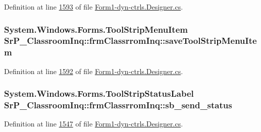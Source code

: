 \-Definition at line \hyperlink{_form1-dyn-ctrls_8_designer_8cs_source_l01593}{1593} of file \hyperlink{_form1-dyn-ctrls_8_designer_8cs_source}{\-Form1-\/dyn-\/ctrls.\-Designer.\-cs}.

\hypertarget{class_sr_p___classroom_inq_1_1frm_classrrom_inq_a7e580a014ae78cc9e8d2ce621a2541f3}{
\subsubsection[{save\-Tool\-Strip\-Menu\-Item}]{\setlength{\rightskip}{0pt plus 5cm}\-System.\-Windows.\-Forms.\-Tool\-Strip\-Menu\-Item {\bf \-Sr\-P\-\_\-\-Classroom\-Inq\-::frm\-Classrrom\-Inq\-::save\-Tool\-Strip\-Menu\-Item}}}
\label{class_sr_p___classroom_inq_1_1frm_classrrom_inq_a7e580a014ae78cc9e8d2ce621a2541f3}


\-Definition at line \hyperlink{_form1-dyn-ctrls_8_designer_8cs_source_l01592}{1592} of file \hyperlink{_form1-dyn-ctrls_8_designer_8cs_source}{\-Form1-\/dyn-\/ctrls.\-Designer.\-cs}.

\hypertarget{class_sr_p___classroom_inq_1_1frm_classrrom_inq_a339bcec3d748bdf74b502189fd7ca9db}{
\subsubsection[{sb\-\_\-send\-\_\-status}]{\setlength{\rightskip}{0pt plus 5cm}\-System.\-Windows.\-Forms.\-Tool\-Strip\-Status\-Label {\bf \-Sr\-P\-\_\-\-Classroom\-Inq\-::frm\-Classrrom\-Inq\-::sb\-\_\-send\-\_\-status}}}
\label{class_sr_p___classroom_inq_1_1frm_classrrom_inq_a339bcec3d748bdf74b502189fd7ca9db}


\-Definition at line \hyperlink{_form1-dyn-ctrls_8_designer_8cs_source_l01547}{1547} of file \hyperlink{_form1-dyn-ctrls_8_designer_8cs_source}{\-Form1-\/dyn-\/ctrls.\-Designer.\-cs}.

